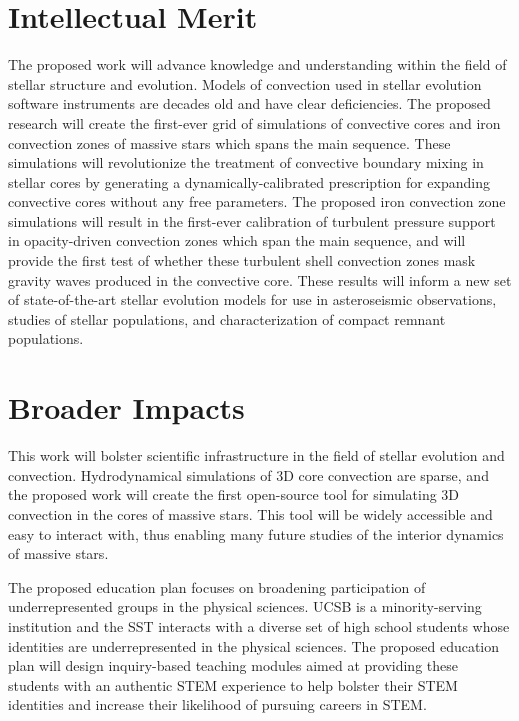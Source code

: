 \documentclass[11pt]{amsart} %
\theoremstyle{definition}
\numberwithin{equation}{section}
\begin{document}
\section*{Intellectual Merit}
The proposed work will advance knowledge and understanding within the field of stellar structure and evolution.
Models of convection used in stellar evolution software instruments are decades old and have clear deficiencies.
The proposed research will create the first-ever grid of simulations of convective cores and iron convection zones of massive stars which spans the main sequence.
These simulations will revolutionize the treatment of convective boundary mixing in stellar cores by generating a dynamically-calibrated prescription for expanding convective cores without any free parameters.
The proposed iron convection zone simulations will result in the first-ever calibration of turbulent pressure support in opacity-driven convection zones which span the main sequence, and will provide the first test of whether these turbulent shell convection zones mask gravity waves produced in the convective core.
These results will inform a new set of state-of-the-art stellar evolution models for use in asteroseismic observations, studies of stellar populations, and characterization of compact remnant populations.


\section*{Broader Impacts}
This work will bolster scientific infrastructure in the field of stellar evolution and convection.
Hydrodynamical simulations of 3D core convection are sparse, and the proposed work will create the first open-source tool for simulating 3D convection in the cores of massive stars.
This tool will be widely accessible and easy to interact with, thus enabling many future studies of the interior dynamics of massive stars.

The proposed education plan focuses on broadening participation of underrepresented groups in the physical sciences.
UCSB is a minority-serving institution and the SST interacts with a diverse set of high school students whose identities are underrepresented in the physical sciences.
The proposed education plan will design inquiry-based teaching modules aimed at providing these students with an authentic STEM experience to help bolster their STEM identities and increase their likelihood of pursuing careers in STEM.
\end{document}
